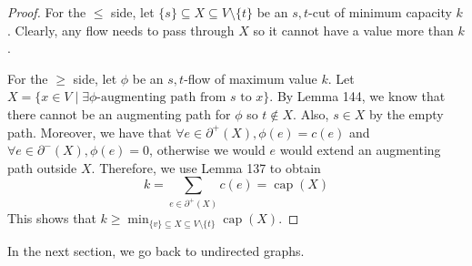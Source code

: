 \documentclass{tufte-handout}
\theoremstyle{definition}
\theoremstyle{remark}
\DeclareMathOperator{\capac}{cap}
\begin{document}
\begin{proof}
	For the $\leq$ side, let $\{s\} \subseteq X \subseteq V \setminus \{t\}$ be an $s,t$-cut of minimum capacity $k$. Clearly, any flow needs to pass through $X$ so it cannot have a value more than $k$.
			
	For the $\geq$ side, let $\phi$ be an $s,t$-flow of maximum value $k$. Let $X = \{x \in V \mid \exists \phi\mbox{-augmenting path from } s \mbox{ to } x\}$. By Lemma 144, we know that there cannot be an augmenting path for $\phi$ so $t \notin X$. Also, $s \in X$ by the empty path. Moreover, we have that $\forall e \in \partial^+(X), \phi(e) = c(e)$ and $\forall e \in \partial^-(X), \phi(e) = 0$, otherwise we would $e$ would extend an augmenting path outside $X$. Therefore, we use Lemma 137 to obtain
	\[ k = \sum_{e \in \partial^+(X)} c(e) = \capac(X) \]
	This shows that $k \geq \min_{\{v\} \subseteq X \subseteq V \setminus \{t\}} \capac(X)$.
\end{proof}

In the next section, we go back to undirected graphs.
\end{document}
